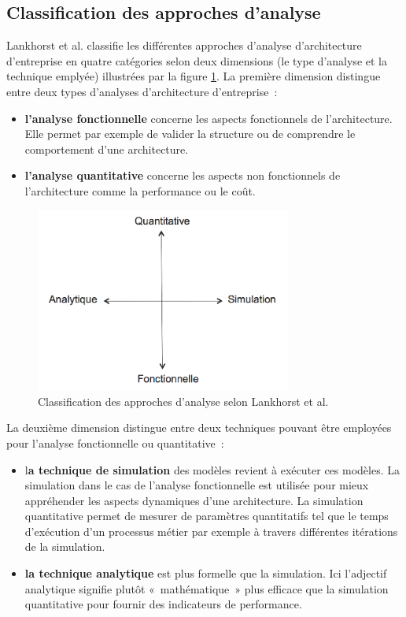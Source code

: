 	\subsection{Classification des approches d'analyse}
Lankhorst et al. \cite{lankhorst2009enterprise} classifie les différentes approches d'analyse d'architecture d'entreprise en quatre catégories selon deux dimensions (le type d'analyse et la technique emplyée) illustrées par la figure \ref{fig:classLankhorst}. La première dimension distingue entre deux types d'analyses d'architecture d'entreprise~:
	\begin{itemize}
		\item \textbf{l'analyse fonctionnelle} concerne les aspects fonctionnels de l'architecture. Elle permet par exemple de valider la structure ou de comprendre le comportement d'une architecture.
		\item \textbf{l'analyse quantitative} concerne les aspects non fonctionnels de l'architecture comme la performance ou le coût. 
\end{itemize}

\begin{figure}[!htbp]
 \begin{center}
  \includegraphics[width=0.75\textwidth]{images/Chapitre1/dimesionsLankhorts.png}
 \end{center}
 \caption{Classification des approches d'analyse selon Lankhorst et al. \protect\cite{lankhorst2009enterprise}}
 \label{fig:classLankhorst}
\end{figure}

La deuxième dimension distingue entre deux techniques pouvant être employées pour l'analyse fonctionnelle ou quantitative~:
	\begin{itemize}
		\item l\textbf{a technique de simulation} des modèles revient à exécuter ces modèles. La simulation dans le cas de l'analyse fonctionnelle est utilisée pour mieux appréhender les aspects dynamiques d'une architecture. La simulation quantitative permet de mesurer de paramètres quantitatifs tel que le temps d'exécution d'un processus métier par exemple à travers différentes itérations de la simulation. 
		\item \textbf{la technique analytique} est plus formelle que la simulation. Ici l'adjectif analytique signifie plutôt «~mathématique~» plus efficace que la simulation quantitative pour fournir des indicateurs de performance.  
	\end{itemize}
	
